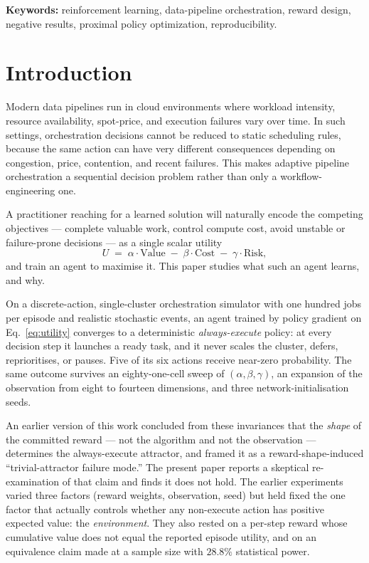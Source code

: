 \documentclass[10pt,twocolumn]{article}
\begin{document}
\vspace{0.4em}
{\small\noindent\textbf{Keywords:} reinforcement learning, data-pipeline
orchestration, reward design, negative results, proximal policy optimization,
reproducibility.}
\vspace{0.6em}

\section{Introduction}
\label{sec:intro}

Modern data pipelines run in cloud environments where workload intensity,
resource availability, spot-price, and execution failures vary over time. In
such settings, orchestration decisions cannot be reduced to static scheduling
rules, because the same action can have very different consequences depending on
congestion, price, contention, and recent failures. This makes adaptive pipeline
orchestration a sequential decision problem rather than only a
workflow-engineering one.

A practitioner reaching for a learned solution will naturally encode the
competing objectives --- complete valuable work, control compute cost, avoid
unstable or failure-prone decisions --- as a single scalar utility
\begin{equation}
\label{eq:utility}
U \;=\; \alpha\cdot\mathrm{Value}\;-\;\beta\cdot\mathrm{Cost}\;-\;\gamma\cdot\mathrm{Risk},
\end{equation}
and train an agent to maximise it. This paper studies what such an agent learns,
and why.

On a discrete-action, single-cluster orchestration simulator with one hundred
jobs per episode and realistic stochastic events, an agent trained by policy
gradient on Eq.~\eqref{eq:utility} converges to a deterministic
\emph{always-execute} policy: at every decision step it launches a ready task,
and it never scales the cluster, defers, reprioritises, or pauses. Five of its
six actions receive near-zero probability. The same outcome survives an
eighty-one-cell sweep of $(\alpha,\beta,\gamma)$, an expansion of the observation
from eight to fourteen dimensions, and three network-initialisation seeds.

An earlier version of this work concluded from these invariances that the
\emph{shape} of the committed reward --- not the algorithm and not the
observation --- determines the always-execute attractor, and framed it as a
reward-shape-induced ``trivial-attractor failure mode.'' The present paper
reports a skeptical re-examination of that claim and finds it does not hold. The
earlier experiments varied three factors (reward weights, observation, seed) but
held fixed the one factor that actually controls whether any non-execute action
has positive expected value: the \emph{environment}. They also rested on a
per-step reward whose cumulative value does not equal the reported episode
utility, and on an equivalence claim made at a sample size with $28.8\%$
statistical power.
\end{document}
